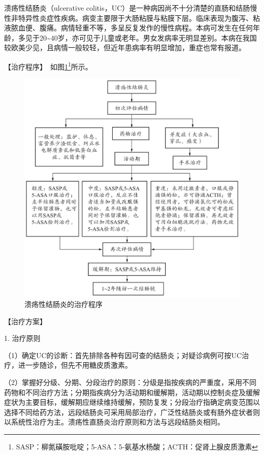 溃疡性结肠炎（ulcerative
colitis，UC）是一种病因尚不十分清楚的直肠和结肠慢性非特异性炎症性疾病。病变主要限于大肠粘膜与粘膜下层。临床表现为腹泻、粘液脓血便、腹痛。病情轻重不等，多呈反复发作的慢性病程。本病可发生在任何年龄，多见于20\textasciitilde{}40岁，亦可见于儿童或老年。男女发病率无明显差别。本病在我国较欧美少见，且病情一般较轻，但近年患病率有明显增加，重症也常有报道。

【治疗程序】　如图\ref{fig3-6-1}\footnote{SASP：柳氮磺胺吡啶；5-ASA：5-氨基水杨酸；ACTH：促肾上腺皮质激素}所示。

\begin{figure}[!htbp]
 \centering
 \includegraphics{./images/Image00092.jpg}
 \captionsetup{justification=centering}
 \caption{溃疡性结肠炎的治疗程序}
 \label{fig3-6-1}
  \end{figure} 


【治疗方案】

1. 治疗原则

（1）确定UC的诊断：首先排除各种有因可查的结肠炎；对疑诊病例可按UC治疗，进一步随诊，但先不用糖皮质激素。

（2）掌握好分级、分期、分段治疗的原则：分级是指按疾病的严重度，采用不同药物和不同治疗方法；分期指疾病分为活动期和缓解期，活动期以控制炎症及缓解症状为主要目标，缓解期应继续维持缓解，预防复发；分段治疗指确定病变范围以选择不同给药方法，远段结肠炎可采用局部治疗，广泛性结肠炎或有肠外症状者则以系统性治疗为主。溃疡性直肠炎治疗原则和方法与远段结肠炎相同。

